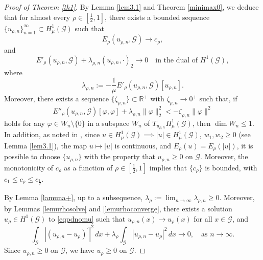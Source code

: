 \documentclass[11pt]{amsart}
\newcommand{\G}{\mathcal{G}}
\numberwithin{equation}{section}
\begin{document}
\begin{proof}[Proof of Theorem \ref{th1}]
By Lemma \ref{lem3.1} and Theorem \ref{minimax0}, we deduce that for almost every $\rho\in[\frac{1}{2},1]$, there exists a bounded sequence \(\{u_{\rho,n}\}_{n=1}^{\infty} \subset H^1_\mu(\mathcal{G})\) such that
\begin{equation*}
E_\rho(u_{\rho,n}, \mathcal{G}) \to c_\rho,
\end{equation*}
and
\begin{equation*}
E'_\rho(u_{\rho,n}, \mathcal{G}) + \lambda_{\rho,n} (u_{\rho,n}, \cdot)_2 \to 0 \quad \text{in the dual of } H^1(\mathcal{G}),
\end{equation*}
where
\begin{equation*}
\lambda_{\rho,n} := -\frac{1}{\mu} E'_\rho(u_{\rho,n}, \mathcal{G})[u_{\rho,n}]. 
\end{equation*}
Moreover, there exists a sequence \(\{\zeta_{\rho,n}\} \subset \mathbb{R}^+\) with \(\zeta_{\rho,n}\to 0^+\) such that, if 
\begin{equation*}
 E''_\rho(u_{\rho,n}, \mathcal{G})[\varphi, \varphi] + \lambda_{\rho,n} \|\varphi\|_2^2 < -\zeta_{\rho,n} \|\varphi\|^2 
\end{equation*}
holds for any \( \varphi \in W_n \setminus \{0\} \) in a subspace \( W_n \) of \( T_{u_{\rho,n}} H^1_\mu(\mathcal{G}) \), then   \(\dim W_n \leq  1 \). In addition, as noted in \cite[Remark 1.8]{Bort0}, since $u\in H^{1}_{\mu}(\mathcal{G})\implies|u|\in H^{1}_{\mu}(\mathcal{G})$, $w_{1},w_{2}\geq 0$ (see Lemma \ref{lem3.1}), the map $u\mapsto|u|$ is continuous, and $E_{\rho}(u)=E_{\rho}(|u|)$, it is possible to choose $\{u_{\rho,n}\}$ with the property that $u_{\rho,n}\geq 0$ on $\mathcal{G}$. Moreover, the monotonicity of $c_\rho$ as a function of $\rho\in [\frac{1}{2},1]$ implies that $\{c_\rho\}$ is bounded, with $c_1\leq c_\rho \leq c_\frac{1}{2}$.

By Lemma \ref{lamuna+}, up to a subsequence, $\displaystyle \lambda_{\rho}:= \lim_{n \to \infty}\lambda_{\rho,n}\geq 0$. Moreover, by  Lemmas \ref{lemurhosolve} and \ref{lemurhoconverge}, there exists a solution $u_\rho\in H^1(\G)$ to \eqref{eqpdnomu} such that $u_{\rho,n}(x) \to u_\rho(x)$ for all $x \in \G$,  and
\begin{equation*}
\int_{\mathcal{G}}|(u_{\rho,n}-u_{\rho})^{\prime}|^{2}\,dx+\lambda_{\rho}\int_{\mathcal{G}}|u_{\rho,n}-u_{\rho}|^{2}\,dx \to 0, \quad \text{as }n \to \infty.
\end{equation*} 
Since $u_{\rho,n}\geq 0$ on $\mathcal{G}$, we have $u_\rho \geq 0$ on $\mathcal{G}$.


\end{proof}
\end{document}
